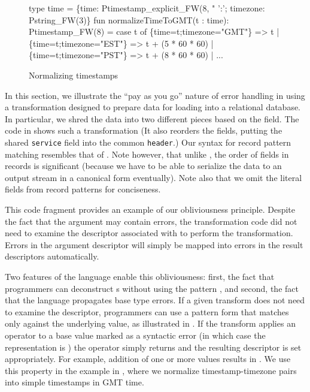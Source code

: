 \begin{figure}
  \centering
  \begin{code}
type time = 
  \{time: Ptimestamp_explicit_FW(8, "%
   ':'; timezone: Pstring_FW(3)\}
\mbox{}
fun normalizeTimeToGMT(t : time): Ptimestamp_FW(8) =
    case t of
      \{time=t;timezone="GMT"\} => t
    | \{time=t;timezone="EST"\} => t + (5 * 60 * 60)
    | \{time=t;timezone="PST"\} => t + (8 * 60 * 60)
    | ...    
  \end{code}
  \caption{Normalizing timestamps}
  \label{fig:ex-normalize}
\end{figure}
In this section, we illustrate the ``pay as you go'' nature of error handling in \datatype{} using a transformation designed to prepare \darkstar{} data for loading into a relational database.  In particular, we shred the data into two different pieces based on the  field.  
The code in  shows such a transformation
(It also reorders the fields, putting the shared \texttt{service} field into the common \texttt{header}.)  Our syntax for record pattern matching resembles that of \sml{}.  Note however, that unlike \sml{}, the order of fields in \datatype{} records is significant (because we have to be able to serialize the data to an output stream in a canonical form eventually).  Note also that we omit the literal fields from \datatype{} record patterns for conciseness.

This code fragment provides an example of our obliviousness principle.  Despite the fact that the argument  may contain errors, the transformation code did not need to examine the descriptor associated with  to perform the transformation.  Errors in the argument descriptor will simply be mapped into errors in the result descriptors automatically.

Two features of the language enable this obliviousness: first, the fact that programmers can deconstruct \pvalue{}s without using the pattern 
, and second, the fact that the language propagates base type errors.  If a given transform does not need to examine the descriptor, programmers can use a pattern form that matches only against the underlying value, as illustrated in .  If the transform applies an operator to a base value marked as a syntactic error (in which case the representation is \btm{}) the operator simply returns \btm{} and the resulting descriptor is set appropriately. 
For example, addition of one or more \btm{} values results
in \btm{}. We use this property in the example in
, where we normalize timestamp-timezone pairs
into simple timestamps in GMT time.



